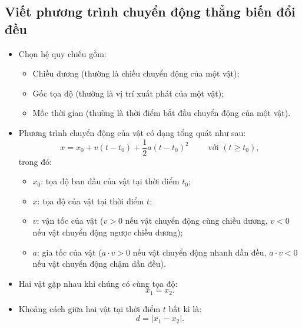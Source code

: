 \subsection{Viết phương trình chuyển động thẳng biến đổi đều}
	\begin{itemize}
	\item Chọn hệ quy chiếu gồm:
	\begin{itemize}
		\item Chiều dương (thường là chiều chuyển động của một vật);
		\item Gốc tọa độ (thường là vị trí xuất phát của một vật);
		\item Mốc thời gian (thường là thời điểm bắt đầu chuyển động của một vật).
	\end{itemize}
	\item Phương trình chuyển động của vật có dạng tổng quát như sau:
	\begin{equation*}
		x=x_0+v(t-t_0)+\dfrac{1}{2}a(t-t_0)^2\qquad\textrm{ với }(t\geq t_0),
	\end{equation*}
	trong đó:
	\begin{itemize}[label=$\circ$]
		\item $x_0$: tọa độ ban đầu của vật tại thời điểm $t_0$;
		\item $x$: tọa độ của vật tại thời điểm $t$;
		\item $v$: vận tốc của vật ($v>0$ nếu vật chuyển động cùng chiều dương, $v<0$ nếu vật chuyển động ngược chiều dương);
		\item $a$: gia tốc của vật ($a\cdot v> 0$ nếu vật chuyển động nhanh dần đều, $a\cdot v< 0$ nếu vật chuyển động chậm dần đều).
	\end{itemize}
	\item Hai vật gặp nhau khi chúng có cùng tọa độ:
	\begin{equation*}
		x_1=x_2.
	\end{equation*}
	\item Khoảng cách giữa hai vật tại thời điểm $t$ bất kì là:
	\begin{equation*}
		d=\left|x_1-x_2\right|.
	\end{equation*}
\end{itemize}	
